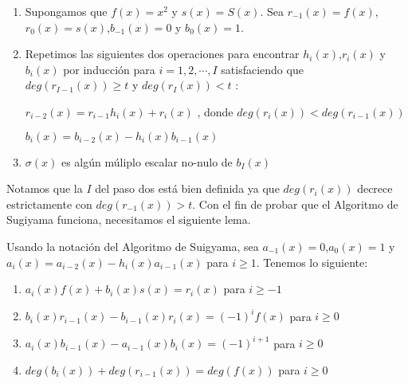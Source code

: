 \begin{enumerate}
\item Supongamos que $f(x) = x^{2}$ y $s(x) = S(x)$. Sea $r_{-1}(x) = f(x)$,$r_0(x) = s(x)$,$b_{-1}(x) = 0$ y $b_0(x) = 1$. 
\item  Repetimos las siguientes dos operaciones para encontrar $h_i(x)$,$r_i(x)$ y $b_i(x)$ por inducción para $i = 1,2,\cdots , I$ satisfaciendo que $deg(r_{I-1}(x)) \geq t$ y $deg(r_{I}(x)) < t$ :


$r_{i-2}(x) = r_{i-1}h_i(x) + r_i(x)$ , donde  $deg(r_i(x)) < deg(r_{i-1}(x))$


$ b_i(x) = b_{i-2}(x) - h_i(x)b_{i-1}(x)$
\item $\sigma(x)$ es algún múliplo escalar no-nulo de $b_I(x)$
\end{enumerate}

Notamos que la $I$ del paso dos está bien definida ya que $deg(r_i(x))$ decrece estrictamente con $deg(r_{-1}(x)) > t$. Con el fin de probar que el Algoritmo de Sugiyama funciona, necesitamos el siguiente lema.

\begin{lemma}
\label{le:tocho_sugiyama}
Usando la notación del Algoritmo de Suigyama, sea $a_{-1}(x) = 0$,$a_0(x) = 1$ y $ a_i(x) = a_{i-2}(x) - h_i(x)a_{i-1}(x)$ para $ i \geq 1$. Tenemos lo siguiente:
\begin{enumerate}
	\item $a_i(x)f(x) + b_i(x)s(x) = r_i(x)$ para $ i \geq -1$
	\item $b_i(x)r_{i-1}(x) - b_{i-1}(x)r_i(x) = (-1)^i f(x)$ para $ i \geq 0$
	\item $a_i(x)b_{i-1}(x) - a_{i-1}(x)b_i(x) = (-1)^{i+1} $ para $ i \geq 0$
	\item $deg(b_i(x)) + deg(r_{i-1}(x)) = deg(f(x))$ para $ i \geq 0$
\end{enumerate}

\end{lemma}

